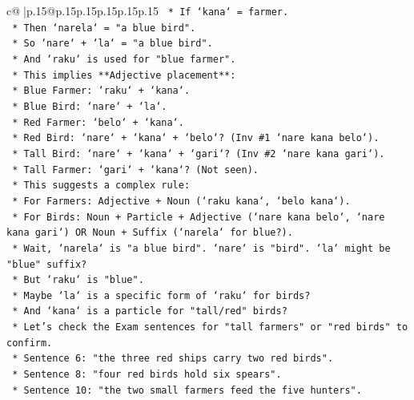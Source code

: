 \documentclass{article}
\begin{document}
{\begin{supertabular}{c@{$\;$}|p{.15\linewidth}@{}p{.15\linewidth}p{.15\linewidth}p{.15\linewidth}p{.15\linewidth}p{.15\linewidth}}
{{{\texttt{            *   If `kana` = farmer.} \\
\texttt{            *   Then `narela` = "a blue bird".} \\
\texttt{            *   So `nare` + `la` = "a blue bird".} \\
\texttt{            *   And `raku` is used for "blue farmer".} \\
\texttt{            *   This implies **Adjective placement**:} \\
\texttt{                *   Blue Farmer: `raku` + `kana`.} \\
\texttt{                *   Blue Bird: `nare` + `la`.} \\
\texttt{                *   Red Farmer: `belo` + `kana`.} \\
\texttt{                *   Red Bird: `nare` + `kana` + `belo`? (Inv \#1 `nare kana belo`).} \\
\texttt{                *   Tall Bird: `nare` + `kana` + `gari`? (Inv \#2 `nare kana gari`).} \\
\texttt{                *   Tall Farmer: `gari` + `kana`? (Not seen).} \\
\texttt{            *   This suggests a complex rule:} \\
\texttt{                *   For Farmers: Adjective + Noun (`raku kana`, `belo kana`).} \\
\texttt{                *   For Birds: Noun + Particle + Adjective (`nare kana belo`, `nare kana gari`) OR Noun + Suffix (`narela` for blue?).} \\
\texttt{                *   Wait, `narela` is "a blue bird". `nare` is "bird". `la` might be "blue" suffix?} \\
\texttt{                *   But `raku` is "blue".} \\
\texttt{                *   Maybe `la` is a specific form of `raku` for birds?} \\
\texttt{                *   And `kana` is a particle for "tall/red" birds?} \\
\texttt{                *   Let's check the Exam sentences for "tall farmers" or "red birds" to confirm.} \\
\texttt{                *   Sentence 6: "the three red ships carry two red birds".} \\
\texttt{                *   Sentence 8: "four red birds hold six spears".} \\
\texttt{                *   Sentence 10: "the two small farmers feed the five hunters".} \\
}}}
\end{supertabular}}
\end{document}
